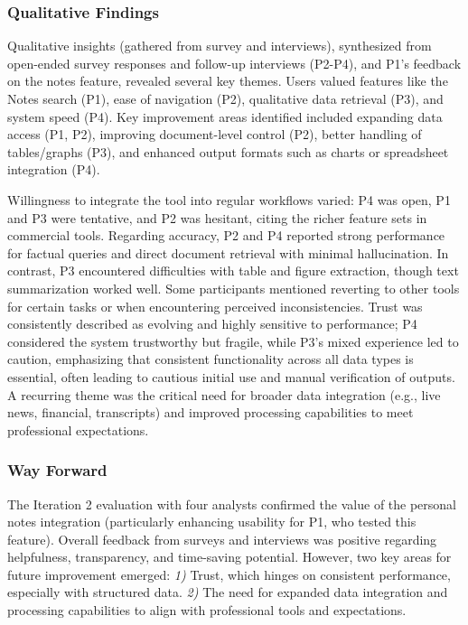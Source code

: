 \documentclass[final,5p,times,twopage,twocolumn,a4paper]{elsarticle}
\begin{document}
\subsubsection{Qualitative Findings}
Qualitative insights (gathered from survey and interviews), synthesized from open-ended survey responses and follow-up interviews (P2-P4), and P1's feedback on the notes feature, revealed several key themes. Users valued features like the Notes search (P1), ease of navigation (P2), qualitative data retrieval (P3), and system speed (P4). Key improvement areas identified included expanding data access (P1, P2), improving document-level control (P2), better handling of tables/graphs (P3), and enhanced output formats such as charts or spreadsheet integration (P4).

Willingness to integrate the tool into regular workflows varied: P4 was open, P1 and P3 were tentative, and P2 was hesitant, citing the richer feature sets in commercial tools. Regarding accuracy, P2 and P4 reported strong performance for factual queries and direct document retrieval with minimal hallucination. In contrast, P3 encountered difficulties with table and figure extraction, though text summarization worked well. Some participants mentioned reverting to other tools for certain tasks or when encountering perceived inconsistencies. Trust was consistently described as evolving and highly sensitive to performance; P4 considered the system trustworthy but fragile, while P3's mixed experience led to caution, emphasizing that consistent functionality across all data types is essential, often leading to cautious initial use and manual verification of outputs. A recurring theme was the critical need for broader data integration (e.g., live news, financial, transcripts) and improved processing capabilities to meet professional expectations.

\subsubsection{Way Forward}
The Iteration 2 evaluation with four analysts confirmed the value of the personal notes integration (particularly enhancing usability for P1, who tested this feature). Overall feedback from surveys and interviews was positive regarding helpfulness, transparency, and time-saving potential. However, two key areas for future improvement emerged: \textit{1)} Trust, which hinges on consistent performance, especially with structured data. \textit{2)} The need for expanded data integration and processing capabilities to align with professional tools and expectations.
\end{document}
